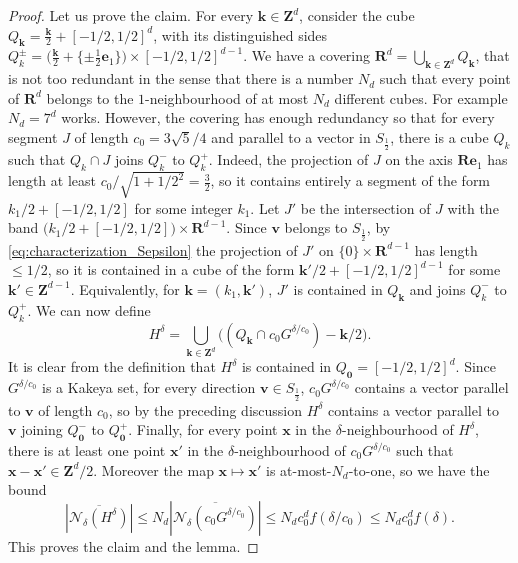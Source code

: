 \documentclass[10pt]{amsart}
\newcommand{\R}{\mathbf{R}}
\newcommand{\Z}{\mathbf{Z}}
\begin{document}
\begin{proof}
  Let us prove the claim. For every $\mathbf{k} \in \Z^d$, consider the cube $Q_{\mathbf{k}}= \frac{\mathbf{k}}{2} + [-1/2,1/2]^d$, with its distinguished sides $Q_k^\pm= \big(\frac{\mathbf{k}}{2} + \{\pm \frac 1 2\mathbf e_1\}\big)\times [-1/2,1/2]^{d-1}$. We have a covering $\R^d= \bigcup_{\mathbf{k}\in \Z^d} Q_{\mathbf{k}}$, that is not too redundant in the sense that there is a number $N_d$ such that every point of $\R^d$ belongs to the $1$-neighbourhood of at most $N_d$ different cubes. For example $N_d=7^d$ works. However, the covering has enough redundancy so that for every segment $J$ of length $c_0=3\sqrt{5}/4$ and parallel to a vector in $S_{\frac 1 2}$, there is a cube $Q_k$ such that $Q_k \cap J$ joins $Q_k^-$ to $Q_k^+$. Indeed, the projection of $J$ on the axis $\R \mathbf{e}_1$ has length at least $c_0/\sqrt{1+1/2^2} = \frac 3 2$, so it contains entirely a segment of the form $k_1/2 + [-1/2,1/2]$ for some integer $k_1$. Let $J'$ be the intersection of $J$ with the band $\big(k_1/2 + [-1/2,1/2]\big) \times \R^{d-1}$. Since $\mathbf{v}$ belongs to $S_{\frac 1 2}$, by \eqref{eq:characterization_Sepsilon} the projection of $J'$ on $\{0\}\times \R^{d-1}$ has length $\leq 1/2$, so it is contained in a cube of the form $\mathbf{k'}/2+[-1/2,1/2]^{d-1}$ for some $\mathbf{k'} \in \Z^{d-1}$. Equivalently, for $\mathbf{k}=(k_1,\mathbf{k'})$, $J'$ is contained in $Q_{\mathbf{k}}$ and joins $Q_k^-$ to $Q_k^+$. We can now define
  \[ H^\delta = \bigcup_{\mathbf{k} \in \Z^d}\Big( (Q_{\mathbf{k}} \cap c_0 G^{\delta/c_0}) - \mathbf{k}/2\Big).\]
    It is clear from the definition that $H^\delta$ is contained in $Q_{\mathbf{0}}=[-1/2,1/2]^d$. Since $G^{\delta/c_0}$ is a Kakeya set, for every direction $\mathbf{v} \in S_{\frac 1 2}$, $c_0 G^{\delta/c_0}$ contains a vector parallel to $\mathbf{v}$ of length $c_0$, so by the preceding discussion $H^\delta$ contains a vector parallel to $\mathbf{v}$ joining $Q_{\mathbf{0}}^-$ to $Q_{\mathbf{0}}^+$. Finally, for every point $\mathbf{x}$ in the $\delta$-neighbourhood of $H^\delta$, there is at least one point $\mathbf x'$ in the $\delta$-neighbourhood of $c_0 G^{\delta/c_0}$ such that $\mathbf{x}-\mathbf{x'} \in \Z^d/2$. Moreover the map $\mathbf{x}\mapsto \mathbf{x'}$ is at-most-$N_d$-to-one, so we have the bound
    \[ |\overline{\mathcal{N}_{\delta}(H^\delta)}| \leq N_d |\overline{\mathcal{N}_{\delta}(c_0 G^{\delta/c_0})}| \leq N_d c_0^d f(\delta/c_0) \leq N_d c_0^d f(\delta).\]
This proves the claim and the lemma.        
\end{proof}
\end{document}

